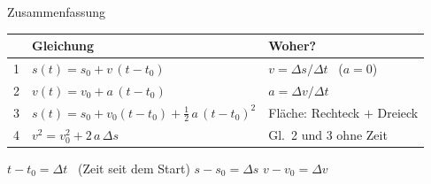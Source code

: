 \documentclass[14pt,aspectratio=169]{beamer}
\begin{document}
\begin{frame}{Zusammenfassung}
  \small
  \centering
  \begin{tabular}{lll}
    \toprule
    & \textbf{Gleichung} & \textbf{Woher?} \\
    \midrule
    1 & $s(t)=s_0+v\,(t-t_0)$ & $v=\Delta s/\Delta t$ \ ($a=0$) \\[0.2em]
    2 & $v(t)=v_0+a\,(t-t_0)$ & $a=\Delta v/\Delta t$ \\[0.2em]
    3 & $s(t)=s_0+v_0(t-t_0)+\tfrac12\,a\,(t-t_0)^2$ & Fläche: Rechteck $+$ Dreieck \\[0.2em]
    4 & $v^2=v_0^2+2\,a\,\Delta s$ & Gl.\ 2 und 3 ohne Zeit \\
    \bottomrule
  \end{tabular}

  \vspace{0.6em}
  \begin{merkbox}
    \centering
    $t-t_0=\Delta t$ \ (Zeit seit dem Start) \qquad
    $s-s_0=\Delta s$ \qquad
    $v-v_0=\Delta v$
  \end{merkbox}
\end{frame}
\end{document}
